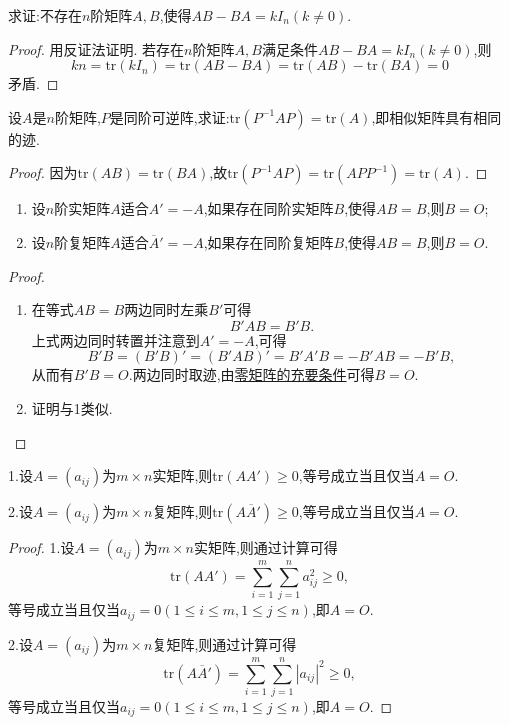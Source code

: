 \documentclass[../../main.tex]{subfiles}
\begin{document}
\begin{example}
求证:不存在\(n\)阶矩阵\(A,B\),使得\(AB - BA = kI_n(k\neq0)\).
\end{example}
\begin{proof}
用反证法证明. 若存在\(n\)阶矩阵\(A,B\)满足条件\(AB - BA = kI_n(k\neq0)\),则
\[
kn=\mathrm{tr}(kI_n)=\mathrm{tr}(AB - BA)=\mathrm{tr}(AB)-\mathrm{tr}(BA)=0
\]
矛盾.

\end{proof}

\begin{proposition}
设\(A\)是\(n\)阶矩阵,\(P\)是同阶可逆阵,求证:\(\mathrm{tr}(P^{-1}AP)=\mathrm{tr}(A)\),即相似矩阵具有相同的迹.
\end{proposition}
\begin{proof}
因为\(\mathrm{tr}(AB)=\mathrm{tr}(BA)\),故\(\mathrm{tr}(P^{-1}AP)=\mathrm{tr}(APP^{-1})=\mathrm{tr}(A)\).

\end{proof}

\begin{proposition}\label{proposition:反称/反酉矩阵为零矩阵的充要条件}
\begin{enumerate}
\item 设\(n\)阶实矩阵\(A\)适合\(A'=-A\),如果存在同阶实矩阵\(B\),使得\(AB = B\),则\(B = O\);
\item 设\(n\)阶复矩阵\(A\)适合\(\overline{A}'=-A\),如果存在同阶复矩阵\(B\),使得\(AB = B\),则\(B = O\).
\end{enumerate}
\end{proposition}
\begin{proof}
\begin{enumerate}
\item 在等式\(AB = B\)两边同时左乘\(B'\)可得
\[
B'AB = B'B.
\]
上式两边同时转置并注意到\(A'=-A\),可得
\[
B'B=(B'B)'=(B'AB)'=B'A'B=-B'AB=-B'B,
\]
从而有\(B'B = O\).两边同时取迹,由\hyperref[proposition:零矩阵的充要条件]{零矩阵的充要条件}可得\(B = O\).
\item 证明与1类似.
\end{enumerate}

\end{proof}

\begin{proposition}\label{proposition:矩阵与其转置乘积的迹}
1.设\(A=(a_{ij})\)为\(m\times n\)实矩阵,则\(\mathrm{tr}(AA')\geqslant 0\),等号成立当且仅当\(A = O\).

2.设\(A=(a_{ij})\)为\(m\times n\)复矩阵,则\(\mathrm{tr}(A\overline{A}')\geqslant 0\),等号成立当且仅当\(A = O\).
\end{proposition}
\begin{proof}
1.设\(A=(a_{ij})\)为\(m\times n\)实矩阵,则通过计算可得
\[
\mathrm{tr}(AA')=\sum_{i = 1}^{m}\sum_{j = 1}^{n}a_{ij}^2\geqslant 0,
\]
等号成立当且仅当\(a_{ij}=0(1\leqslant  i\leqslant  m,1\leqslant  j\leqslant  n)\),即\(A = O\).

2.设\(A=(a_{ij})\)为\(m\times n\)复矩阵,则通过计算可得
\[
\mathrm{tr}(A\overline{A}')=\sum_{i = 1}^{m}\sum_{j = 1}^{n}|a_{ij}|^2\geqslant 0,
\]
等号成立当且仅当\(a_{ij}=0(1\leqslant  i\leqslant  m,1\leqslant  j\leqslant  n)\),即\(A = O\).

\end{proof}
\end{document}
